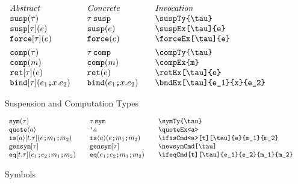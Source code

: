 \documentclass[11pt]{article}
\begin{document}
\begin{figure}

  \begin{small}
    \begin{displaymath}
      \begin{array}{l@{\qquad}l@{\qquad}l@{\qquad}l}
        \textit{Abstract} & \textit{Concrete} & \textit{Invocation} \\
        \suspTy{\tau}           & \suspTy*{\tau}           & \verb|\suspTy{\tau}|           \\
        \suspEx[\tau]{e}        & \suspEx*{e}        & \verb|\suspEx[\tau]{e}|        \\
        \forceEx[\tau]{e}       & \forceEx*{e}       & \verb|\forceEx[\tau]{e}|   \\[1ex]

        \compTy{\tau}           & \compTy*{\tau}           & \verb|\compTy{\tau}|           \\
        \compEx{m}              & \compEx*{m}              & \verb|\compEx{m}|              \\
        \retEx[\tau]{e}         & \retEx*[\tau]{e}         & \verb|\retEx[\tau]{e}|         \\
        \bndEx[\tau]{e_1}{x}{e_2} & \bndEx*[\tau]{e_1}{x}{e_2} & \verb|\bndEx[\tau]{e_1}{x}{e_2}|
    \end{array}
    \end{displaymath}
  \end{small}

  \caption{Suspension and Computation Types}
  \label{fig:comp-susp}
\end{figure}

\begin{figure}
  
  \begin{small}
    \begin{displaymath}
      \begin{array}{l@{\qquad}l@{\qquad}l@{\qquad}l}
        \symTy{\tau}               & \symTy*{\tau}              & \verb|\symTy{\tau}|                \\
        \quoteEx<a>                & \quoteEx*<a>               & \verb|\quoteEx<a>|                 \\
        \ifisCmd<a>[t][\tau]{e}{m_1}{m_2} & \ifisCmd*<a>{e}{m_1}{m_2}  & \verb|\ifisCmd<a>[t][\tau]{e}{m_1}{m_2}| \\
        \newsymCmd[\tau]           & \newsymCmd*[\tau]          & \verb|\newsymCmd[\tau]| \\
        \ifeqCmd[t][\tau]{e_1}{e_2}{m_1}{m_2} & \ifeqCmd*{e_1}{e_2}{m_1}{m_2} & \verb|\ifeqCmd[t][\tau]{e_1}{e_2}{m_1}{m_2}| \\
      \end{array}
    \end{displaymath}
  \end{small}

  \caption{Symbols}
  \label{fig:sym}
\end{figure}
\end{document}
